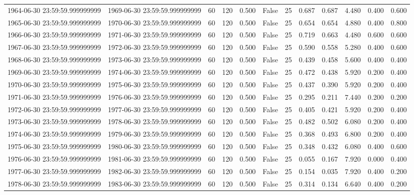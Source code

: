\begin{table}
\begin{tabular}{lccccccccccc}
1964-06-30 23:59:59.999999999 & 1969-06-30 23:59:59.999999999 & 60 & 120 & 0.500 & False & 25 & 0.687 & 0.687 & 4.480 & 0.400 & 0.600 \\
1965-06-30 23:59:59.999999999 & 1970-06-30 23:59:59.999999999 & 60 & 120 & 0.500 & False & 25 & 0.654 & 0.654 & 4.880 & 0.400 & 0.800 \\
1966-06-30 23:59:59.999999999 & 1971-06-30 23:59:59.999999999 & 60 & 120 & 0.500 & False & 25 & 0.719 & 0.663 & 4.480 & 0.600 & 0.600 \\
1967-06-30 23:59:59.999999999 & 1972-06-30 23:59:59.999999999 & 60 & 120 & 0.500 & False & 25 & 0.590 & 0.558 & 5.280 & 0.400 & 0.600 \\
1968-06-30 23:59:59.999999999 & 1973-06-30 23:59:59.999999999 & 60 & 120 & 0.500 & False & 25 & 0.439 & 0.458 & 5.600 & 0.400 & 0.400 \\
1969-06-30 23:59:59.999999999 & 1974-06-30 23:59:59.999999999 & 60 & 120 & 0.500 & False & 25 & 0.472 & 0.438 & 5.920 & 0.200 & 0.400 \\
1970-06-30 23:59:59.999999999 & 1975-06-30 23:59:59.999999999 & 60 & 120 & 0.500 & False & 25 & 0.437 & 0.390 & 5.920 & 0.200 & 0.400 \\
1971-06-30 23:59:59.999999999 & 1976-06-30 23:59:59.999999999 & 60 & 120 & 0.500 & False & 25 & 0.295 & 0.211 & 7.440 & 0.200 & 0.200 \\
1972-06-30 23:59:59.999999999 & 1977-06-30 23:59:59.999999999 & 60 & 120 & 0.500 & False & 25 & 0.405 & 0.421 & 5.920 & 0.200 & 0.400 \\
1973-06-30 23:59:59.999999999 & 1978-06-30 23:59:59.999999999 & 60 & 120 & 0.500 & False & 25 & 0.482 & 0.502 & 6.080 & 0.200 & 0.400 \\
1974-06-30 23:59:59.999999999 & 1979-06-30 23:59:59.999999999 & 60 & 120 & 0.500 & False & 25 & 0.368 & 0.493 & 6.800 & 0.200 & 0.400 \\
1975-06-30 23:59:59.999999999 & 1980-06-30 23:59:59.999999999 & 60 & 120 & 0.500 & False & 25 & 0.348 & 0.432 & 6.080 & 0.400 & 0.600 \\
1976-06-30 23:59:59.999999999 & 1981-06-30 23:59:59.999999999 & 60 & 120 & 0.500 & False & 25 & 0.055 & 0.167 & 7.920 & 0.000 & 0.400 \\
1977-06-30 23:59:59.999999999 & 1982-06-30 23:59:59.999999999 & 60 & 120 & 0.500 & False & 25 & 0.154 & 0.035 & 7.920 & 0.400 & 0.200 \\
1978-06-30 23:59:59.999999999 & 1983-06-30 23:59:59.999999999 & 60 & 120 & 0.500 & False & 25 & 0.314 & 0.134 & 6.640 & 0.400 & 0.200 \\

\end{tabular}
\end{table}
